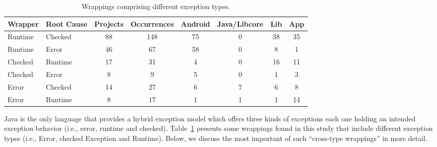 \begin{table}
\scriptsize
  \centering
  \begin{tabular}{llcccccc}
    \hline
    \bfseries{Wrapper}  &  \bfseries{Root Cause} &  \bfseries{Projects}  &  \bfseries{Occurrences} & \textsf{Android} & \textsf{Java/Libcore} & \textsf{Lib} & \textsf{App}  \\
    \hline

      Runtime &  Checked   & 88 & 148 &  75 &  0   & 38 &  35 \\  %
      Runtime   &  Error      & 46  &  67    &  58  &  0   & 8  &  1   \\      %
      Checked &  Runtime   & 17  & 31 & 4 &  0  & 16  &  11 \\  %
      Checked & Error         & 8    &  9  & 5  &  0  &  1 &  3  \\
      Error & Checked         & 14  &  27 &  6  &  7  &  6 &   8    \\
      Error & Runtime        & 8      &  17   & 1 &  1  & 1 &  14    \\

  \hline
  \end{tabular}
\caption{Wrappings comprising different exception types.}
\label{tab:wrappingandroid}
\end{table}

Java is the only language that provides a hybrid exception model
which offers three kinds of exceptions each one holding an intended exception behavior (i.e., error,
runtime and checked). Table~\ref{tab:wrappingandroid} presents some wrappings found in this study that
include different exception types (i.e., Error, checked Exception and Runtime).
Below, we discuss the most
important of such ``cross-type wrappings'' in more detail.

